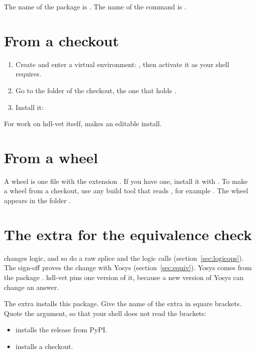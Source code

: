 The name of the package is . The name of the command is .

\section{From a checkout}

\begin{enumerate}
\item Create and enter a virtual environment:
  , then activate it as your shell requires.
\item Go to the folder of the checkout, the one that holds .
\item Install it: 
\end{enumerate}

For work on hdl-vet itself,  makes an editable install.

\section{From a wheel}

A wheel is one file with the extension . If you have one,
install it with . To make a wheel from a checkout,
use any build tool that reads , for example
. The wheel appears in the folder .

\section{The extra for the equivalence check}
\label{sec:extra}

 changes logic, and so do a raw splice and the logic calls
(section~\ref{sec:logicops}). The sign-off proves the change with Yosys
(section~\ref{sec:equiv}). Yosys comes from the package . hdl-vet pins
one version of it, because a new version of Yosys can change an answer.

The extra  installs this package. Give the name of the extra in square
brackets. Quote the argument, so that your shell does not read the brackets:

\begin{itemize}
\item {} installs the release from PyPI.
\item {} installs a checkout.
\end{itemize}

